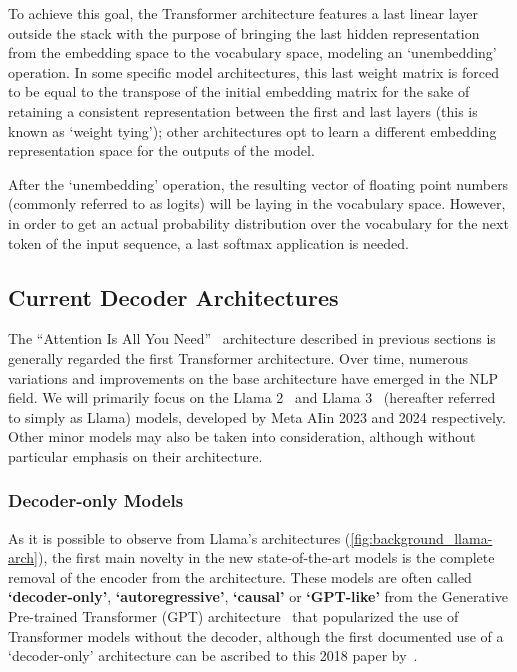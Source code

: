 To achieve this goal, the Transformer architecture features a last linear layer outside the stack with the purpose of bringing the last hidden representation from the embedding space to the vocabulary space, modeling an `unembedding' operation.
In some specific model architectures, this last weight matrix is forced to be equal to the transpose of the initial embedding matrix for the sake of retaining a consistent representation between the first and last layers (this is known as `weight tying'); other architectures opt to learn a different embedding representation space for the outputs of the model.

After the `unembedding' operation, the resulting vector of floating point numbers (commonly referred to as logits) will be laying in the vocabulary space.
However, in order to get an actual probability distribution over the vocabulary for the next token of the input sequence, a last softmax application is needed.

\subsection{Current Decoder Architectures}\label{ssec:background_transf_current}

The ``Attention Is All You Need''~\cite{vaswani2017} architecture described in previous sections is generally regarded the first Transformer architecture.
Over time, numerous variations and improvements on the base architecture have emerged in the NLP field.
We will primarily focus on the Llama 2~\cite{touvron2023} and Llama 3~\cite{dubey2024} (hereafter referred to simply as Llama) models, developed by Meta AI\footnotemark in 2023 and 2024 respectively.
Other minor models may also be taken into consideration, although without particular emphasis on their architecture.


\subsubsection*{Decoder-only Models}

As it is possible to observe from Llama's architectures (\cref{fig:background_llama-arch}), the first main novelty in the new state-of-the-art models is the complete removal of the encoder from the architecture.
These models are often called \textbf{`decoder-only'}, \textbf{`autoregressive'}, \textbf{`causal'} or \textbf{`GPT-like'} from the Generative Pre-trained Transformer (GPT) architecture~\cite{radford2018,radford2019,brown2020,openai2023} that popularized the use of Transformer models without the decoder, although the first documented use of a `decoder-only' architecture can be ascribed to this 2018 paper by~\citet{liu2018}.

